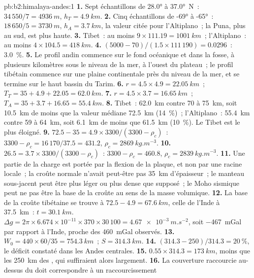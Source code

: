 \begin{solution}{pb:b2:himalaya-andes:1}
\textbf{1.} Sept échantillons de \ang{28.0} à \ang{37.0}~N~: $34\,550/7 = \qty{4936}{m}$, $h_T
= \qty{4.9}{km}$.
\textbf{2.} Cinq échantillons de \ang{-69} à \ang{-65}~: $18\,650/5 = \qty{3730}{m}$, $h_A =
\qty{3.7}{km}$, la valeur citée pour l'Altiplano~; la Puna, plus au sud, est plus haute.
\textbf{3.} Tibet~: au moins $9\times111.19 = \qty{1001}{km}$~; l'Altiplano~: au moins $4\times
104.5 = \qty{418}{km}$.
\textbf{4.} $(5000 - 70)/(1.5\times111\,190) = 0.0296$~: \qty{3.0}{\percent}.
\textbf{5.} Le profil andin commence sur le fond océanique et dans la fosse, à plusieurs
kilomètres sous le niveau de la mer, à l'ouest du plateau~; le profil tibétain commence sur
une plaine continentale près du niveau de la mer, et se termine sur le haut bassin du Tarim.
\textbf{6.} $r = 4.5\times4.9 = \qty{22.05}{km}$~; $T_T = 35 + 4.9 + 22.05 = \qty{62.0}{km}$.
\textbf{7.} $r = 4.5\times3.7 = \qty{16.65}{km}$~; $T_A = 35 + 3.7 + 16.65 = \qty{55.4}{km}$.
\textbf{8.} Tibet~: \qty{62.0}{km} contre 70 à \qty{75}{km}, soit \qty{10.5}{km} de moins que la valeur
médiane \qty{72.5}{km} (\qty{14}{\percent})~; l'Altiplano~: \qty{55.4}{km} contre 59 à \qty{64}{km},
soit \qty{6.1}{km} de moins que \qty{61.5}{km} (\qty{10}{\percent}). Le Tibet est le plus éloigné.
\textbf{9.} $72.5 - 35 = 4.9\times3300/(3300 - \rho_c)$~: $3300 - \rho_c = 16\,170/37.5 =
431.2$, $\rho_c = \qty{2869}{kg.m^{-3}}$.
\textbf{10.} $26.5 = 3.7\times3300/(3300 - \rho_c)$~: $3300 - \rho_c = 460.8$, $\rho_c =
\qty{2839}{kg.m^{-3}}$.
\textbf{11.} Une partie de la charge est portée par la flexion de la plaque, et non par une racine locale~; la
croûte normale n'avait peut-être pas \qty{35}{km} d'épaisseur~; le manteau sous-jacent peut être plus léger ou
plus dense que supposé~; le Moho sismique peut ne pas être la base de la croûte au sens de la masse volumique.
\textbf{12.} La base de la croûte tibétaine se trouve à $72.5 - 4.9 = \qty{67.6}{km}$, celle de l'Inde
à \qty{37.5}{km}~: $t = \qty{30.1}{km}$. $\Delta g = 2\pi\times6.674\times10^{-11}\times370\times
30\,100 = \qty{4.67e-3}{m.s^{-2}}$, soit \qty{-467}{mGal}
par rapport à l'Inde, proche des \qty{460}{mGal} observés.
\textbf{13.} $W_0 = 440\times60/35 = \qty{754.3}{km}$~; $S = \qty{314.3}{km}$.
\textbf{14.} $(314.3 - 250)/314.3 = \qty{20}{\percent}$,
le déficit constaté dans les Andes centrales.
\textbf{15.} $0.55\times314.3 = \qty{173}{km}$, moins que les
\qty{250}{km} des , qui suffiraient alors largement.
\textbf{16.} La couverture raccourcie au-dessus du  doit correspondre à un raccourcissement

\end{solution}
